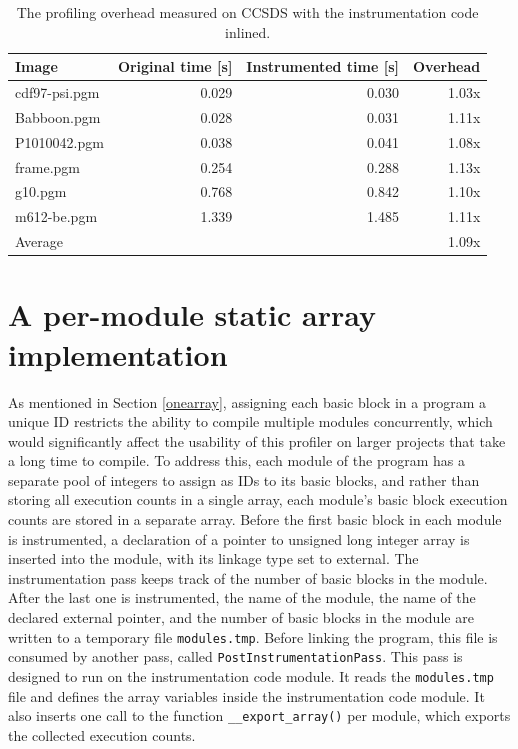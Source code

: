 \begin{table}[]
    \centering
    \begin{tabular}{lrrr}
    \textbf{Image} & \textbf{Original time [s]} & \textbf{Instrumented time [s]} & \textbf{Overhead}  \\ 
    \hline
    \hline
    cdf97-psi.pgm & 0.029 & 0.030 & 1.03x \\
    Babboon.pgm & 0.028 & 0.031 & 1.11x \\
    P1010042.pgm & 0.038 & 0.041 & 1.08x \\
    frame.pgm & 0.254 & 0.288 & 1.13x \\
    g10.pgm & 0.768 & 0.842 & 1.10x \\
    m612-be.pgm & 1.339 & 1.485 & 1.11x \\ \hline
    Average & & & 1.09x
    \end{tabular}
    \caption{The profiling overhead measured on CCSDS with the instrumentation code inlined.}
    \label{tab:ccsds-inlined}
\end{table}

\section{A per-module static array implementation}
\label{multiarray}

As mentioned in Section \ref{onearray}, assigning each basic block in a program a unique ID restricts the ability to compile multiple modules concurrently, which would significantly affect the usability of this profiler on larger projects that take a long time to compile. To address this, each module of the program has a separate pool of integers to assign as IDs to its basic blocks, and rather than storing all execution counts in a single array, each module's basic block execution counts are stored in a separate array. Before the first basic block in each module is instrumented, a declaration of a pointer to unsigned long integer array is inserted into the module, with its linkage type set to external. The instrumentation pass keeps track of the number of basic blocks in the module. After the last one is instrumented, the name of the module, the name of the declared external pointer, and the number of basic blocks in the module are written to a temporary file  \texttt{modules.tmp}. Before linking the program, this file is consumed by another pass, called \texttt{PostInstrumentationPass}. This pass is designed to run on the instrumentation code module. It reads the \texttt{modules.tmp} file and defines the array variables inside the instrumentation code module. It also inserts one call to the function \texttt{\_\_export\_array()} per module, which exports the collected execution counts.

